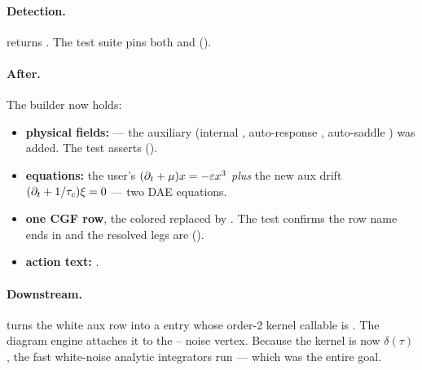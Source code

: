 \paragraph{Detection.}  returns . The test suite pins both
 and 
().

\paragraph{After.} The builder now holds:
\begin{itemize}
  \item \textbf{physical fields:} \code{['dx', 'dxi']} --- the auxiliary 
        (internal , auto-response , auto-saddle )
        was added. The test asserts 
        ().
  \item \textbf{equations:} the user's $(\partial_t+\mu)x = -\varepsilon x^3$ \emph{plus}
        the new aux drift $(\partial_t + 1/\tau_c)\xi = 0$ --- two DAE equations.
  \item \textbf{one CGF row}, the colored  replaced by
        . The test confirms the row name ends in
         and the resolved legs are 
        ().
  \item \textbf{action text:}
        .
\end{itemize}

\paragraph{Downstream.}  turns the white aux
row into a  entry whose order-2 kernel callable
is . The diagram
engine attaches it to the -- noise vertex. Because the kernel
is now $\delta(\tau)$, the fast white-noise analytic integrators run --- which was
the entire goal.


